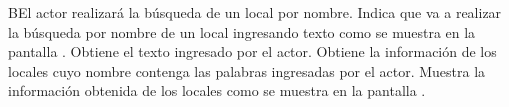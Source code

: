 	\begin{UCtrayectoriaA}{B}{El actor realizará la búsqueda de un local por nombre.}
		\UCpaso[\UCactor] Indica que va a realizar la búsqueda por nombre de un local ingresando texto como se muestra en la pantalla .
		\UCpaso Obtiene el texto ingresado por el actor.
		\UCpaso Obtiene la información de los locales cuyo nombre contenga las palabras ingresadas por el actor.
		\UCpaso Muestra la información obtenida de los locales como se muestra en la pantalla .
	\end{UCtrayectoriaA}

	
	
